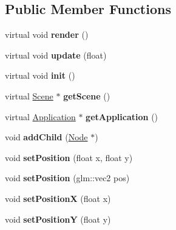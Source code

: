 \subsection*{Public Member Functions}
\begin{DoxyCompactItemize}
\item 
\mbox{\label{classsage_1_1Node_ab93a6f41e02422a21c44227c0355382a}} 
virtual void {\bfseries render} ()
\item 
\mbox{\label{classsage_1_1Node_afb6fd960f9f466e7e682e2a4b650b71d}} 
virtual void {\bfseries update} (float)
\item 
\mbox{\label{classsage_1_1Node_ab87776adae83149e235e37ed469f4e10}} 
virtual void {\bfseries init} ()
\item 
\mbox{\label{classsage_1_1Node_a22d0dfa466965da0324d47d22eb24e6b}} 
virtual \mbox{\hyperlink{classsage_1_1Scene}{Scene}} $\ast$ {\bfseries get\+Scene} ()
\item 
\mbox{\label{classsage_1_1Node_af0f8bb1150be77ccc56cf470f3058176}} 
virtual \mbox{\hyperlink{classsage_1_1Application}{Application}} $\ast$ {\bfseries get\+Application} ()
\item 
\mbox{\label{classsage_1_1Node_a1225e6fa679bb704472b079755ec9a3f}} 
void {\bfseries add\+Child} (\mbox{\hyperlink{classsage_1_1Node}{Node}} $\ast$)
\item 
\mbox{\label{classsage_1_1Node_aaa8545c103ef1b35e5076dbedab93af5}} 
void {\bfseries set\+Position} (float x, float y)
\item 
\mbox{\label{classsage_1_1Node_ae2731cefe38e706c2bf21afae6da18b3}} 
void {\bfseries set\+Position} (glm\+::vec2 pos)
\item 
\mbox{\label{classsage_1_1Node_ae1dfc73d6122a95778d5d9db3d1fd913}} 
void {\bfseries set\+PositionX} (float x)
\item 
\mbox{\label{classsage_1_1Node_a5c97d36655f0daa71a5f6c715d2b0470}} 
void {\bfseries set\+PositionY} (float y)

\end{DoxyCompactItemize}
